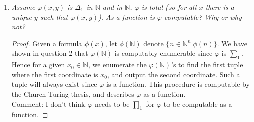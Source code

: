 \documentclass{article}
\begin{document}
\begin{enumerate}[label={\bf Q\arabic*:}]
    \begin{proof}
      Yes $W$ is computably enumerable. If $W$ is finite then it is
      trivially computably enumerable. So assume $W$ is infinite. Now since
      $\varphi$ is $\sum_1$, $\varphi(x)$ is equivalent to $\exists
      y\;\phi(x,y)$ for some $\Delta_0$-formula $\phi$. Fix any
      computable permutation
      $p:\mathbb{N}\rightarrow\mathbb{N}\times\mathbb{N}$, and let $\pi_i$
      denote the $i$th projection function. Consider the function
      $f(n):\mathbb{N}\rightarrow\mathbb{N}$ defined recursively as
      follows: \\

      At input $0$, we find the first $s_0\in\mathbb{N}$ such that
      $\phi(\pi_1(p(s_0)),\pi_2(p(s_0)))$ holds, and output
      $\pi_1(p(s_0))$. Then, at input $n+1$, we find the next
      $s_{n+1}>s_{n}$ such that $\phi(\pi_1(p(s_{n+1})),\pi_2(p(s_{n+1})))$
      holds, and output $\pi_1(p(s_{n+1}))$. Note that the $s_{n}$'s exists
      because $W$ is infinite. Also, given $m,n\in\mathbb{N}$, checking if
      $\phi(m,n)$ holds is al algorithmic procedure that always terminates
      since $\phi$ is $\Delta_0$.  So $f$ is defined by an
      algorithmic procedure and produces an output for every input,
      therefore it is total recursive by the Church-Turing thesis. Also,
      since $p$ is surjective, $f$ will enumerate all elements of $W$. 
    \end{proof}

  \item \it Assume $\varphi(x,y)$ is $\Delta_1$ in $\mathbb{N}$ and
    in $\mathbb{N}$, $\varphi$ is total (so for all $x$ there is a unique
    $y$ such that $\varphi(x,y)$). As a function is $\varphi$ computable?
    Why or why not?

    \begin{proof}
      Given a formula $\phi(\bar{x})$, let $\phi(\mathbb{N})$ denote
      $\{\bar{n}\in\mathbb{N}^n|\phi(\bar{n})\}$. We have shown in
      question 2 that $\varphi(\mathbb{N})$ is computably enumerable since
      $\varphi$ is $\sum_1$. Hence for a given $x_0\in\mathbb{N}$, we
      enumerate the $\varphi(\mathbb{N})$'s to find the first tuple where
      the first coordinate is $x_0$, and output the second coordinate. Such
      a tuple will always exist since $\varphi$ is a function. This
      procedure is computable by the Church-Turing thesis, and describes
      $\varphi$ as a function. \\

      Comment: I don't think $\varphi$ needs to be $\prod_1$ for $\varphi$
      to be computable as a function.
    \end{proof}


\end{enumerate}
\end{document}
